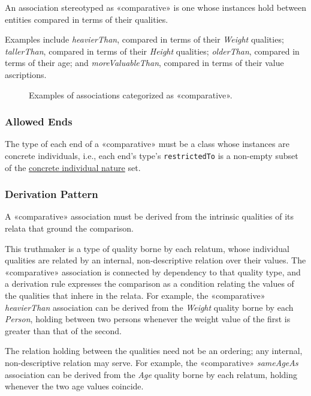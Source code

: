 An association stereotyped as «comparative» is one whose instances hold between entities compared in terms of their qualities.

Examples include \textit{heavierThan}, compared in terms of their \textit{Weight} qualities; \textit{tallerThan}, compared in terms of their \textit{Height} qualities; \textit{olderThan}, compared in terms of their age; and \textit{moreValuableThan}, compared in terms of their value ascriptions.


\begin{figure}[h]
    \centering
    
    \caption{Examples of associations categorized as «comparative».}
    \label{fig:comparative-example}
\end{figure}


\subsubsection{Allowed Ends}

The type of each end of a «comparative» must be a class whose instances are concrete individuals, i.e., each end's type's \texttt{restrictedTo} is a non-empty subset of the \hyperref[par:concrete-individual-nature]{concrete individual nature} set.

\subsubsection{Derivation Pattern}

A «comparative» association must be derived from the intrinsic qualities of its relata that ground the comparison.

This truthmaker is a type of quality borne by each relatum, whose individual qualities are related by an internal, non-descriptive relation over their values. The «comparative» association is connected by dependency to that quality type, and a derivation rule expresses the comparison as a condition relating the values of the qualities that inhere in the relata. For example, the «comparative» \textit{heavierThan} association can be derived from the \textit{Weight} quality borne by each \textit{Person}, holding between two persons whenever the weight value of the first is greater than that of the second.

The relation holding between the qualities need not be an ordering; any internal, non-descriptive relation may serve. For example, the «comparative» \textit{sameAgeAs} association can be derived from the \textit{Age} quality borne by each relatum, holding whenever the two age values coincide.

